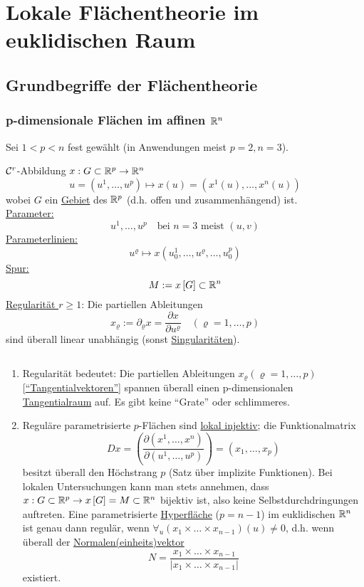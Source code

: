 \chapter{Lokale Flächentheorie im euklidischen Raum}
\section{Grundbegriffe der Flächentheorie}
\subsection{p-dimensionale Flächen im affinen $\mathbb{R}^n$}
Sei \(1 < p < n\) fest gewählt (in Anwendungen meist \(p = 2, n= 3\)).\\
 
\begin{definition}
\(\mathcal{C}^r\)-Abbildung \(x: G \subset \mathbb{R}^p \to \mathbb{R}^n\)
\[
 u = \left( u^1, \dots , u^p \right) \mapsto x(u) = \left(x^1(u), \dots, x^n (u) \right) 
\]
wobei \(G\) ein \uline{Gebiet} des \(\mathbb{R}^p\) (d.h. offen und zusammenhängend) ist.\\
\uline{Parameter:} \[ u^1, \dots , u^p \quad \text{bei }n = 3\text{ meist }(u,v) \]
\uline{Parameterlinien:}
\[u^\varrho \mapsto x \left(u^1_0, \dots , u^\varrho , \dots , u^p_0 \right)\]
\uline{Spur:} \[M:= x\left[G \right] \subset \mathbb{R}^n\]
\uline{Regularität \(r \geq 1\)}: Die partiellen Ableitungen 
\[x_\varrho := \partial_\varrho x = \frac{\partial x}{\partial u^\varrho} \quad (\varrho = 1, \dots , p)\] 
sind überall linear unabhängig (sonst \uline{Singularitäten}).
\end{definition}

\begin{bemerkung}\(\)
\begin{enumerate}
 \item Regularität bedeutet: Die partiellen Ableitungen \(x_\varrho (\varrho = 1, \ldots , p)\) [\underline{"`Tangentialvektoren"'}] spannen überall einen p-dimensionalen \uline{Tangentialraum} auf. Es gibt keine "`Grate"' oder schlimmeres.
 \item Reguläre parametrisierte \(p\)-Flächen sind \uline{lokal injektiv}; die Funktionalmatrix 
\[Dx = \left(\frac{\partial (x^1, \dots , x^n)}{\partial (u^1, \ldots , u^p)}\right) = \left(x_1, \ldots , x_p\right)\]
besitzt überall den Höchstrang \(p\) (Satz über implizite Funktionen). Bei lokalen Untersuchungen kann man stets annehmen, dass \(x : G \subset \mathbb{R}^p \rightarrow x \left[G \right] = M \subset \mathbb{R}^n\) bijektiv ist, also keine Selbstdurchdringungen auftreten. Eine parametrisierte \uline{Hyperfläche} (\(p = n-1\)) im euklidischen \(\mathbb{R}^n\) ist genau dann regulär, wenn \(\forall_{u} \left(x_1 \times \ldots \times x_{n-1} \right) (u) \neq 0\), d.h. wenn überall der \uline{Normalen(einheits)vektor} 
\[N = \frac{x_1 \times \ldots \times x_{n-1}}{|x_1 \times \ldots \times x_{n-1}|}\] 
existiert.
\end{enumerate}
\end{bemerkung}

